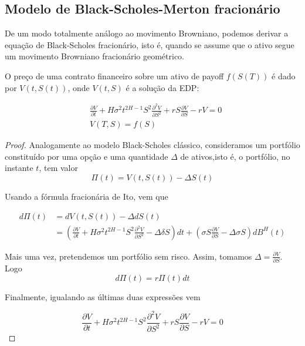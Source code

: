 \documentclass{article}
\begin{document}
\vspace{2cm}

\subsection{Modelo de Black-Scholes-Merton fracionário}
De um modo totalmente análogo ao movimento Browniano, podemos derivar a equação de Black-Scholes fracionário, isto é, quando se assume que o ativo segue um movimento Browniano fracionário geométrico. 
\begin{thm}   

O preço de uma contrato financeiro sobre um ativo de payoff $f(S(T))$ é dado por $V(t,S(t))$, onde $V(t,S)$ é a solução da EDP:

\begin{align*}
    &\frac{\partial V}{\partial t}+H \sigma^2 t^{2H-1}S^2 \frac{\partial^2V}{\partial S^2}+rS\frac{\partial V}{\partial S}-rV=0\\
    &V(T,S)=f(S)
\end{align*}
\end{thm}

\begin{proof}
    Analogamente ao modelo Black-Scholes clássico, consideramos um portfólio constituído por uma opção e uma quantidade $\Delta$ de ativos,isto é, o portfólio, no instante $t$, tem valor $$\Pi(t)=V(t,S(t))-\Delta S(t)$$

    Usando a fórmula fracionária de Ito, vem que 

    \begin{align*}
        d\Pi(t)&=dV(t,S(t))-\Delta dS(t)\\
               &=\left( \frac{\partial V}{\partial t} +H \sigma^2 t^{2H-1}S^2 \frac{\partial^2V}{\partial S^2} -\Delta \delta S \right)dt+ \left( \sigma S\frac{\partial V}{\partial S} -\Delta \sigma S \right) dB^H(t)
    \end{align*}

    Mais uma vez, pretendemos um portfólio  sem risco. Assim, tomamos $\Delta=\frac{\partial V}{\partial S}$. Logo 
    $$d \Pi(t)=r \Pi(t)dt$$

    Finalmente, igualando as últimas duas expressões vem 

    $$\frac{\partial V}{\partial t}+H \sigma^2 t^{2H-1}S^2 \frac{\partial^2V}{\partial S^2}+rS\frac{\partial V}{\partial S}-rV=0$$
    
\end{proof}
\end{document}
